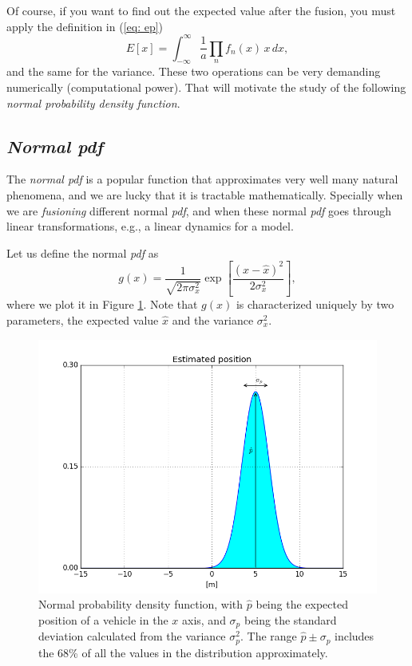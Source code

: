 \documentclass[11pt,a4paper]{article}
\begin{document}
Of course, if you want to find out the expected value after the fusion, you must apply the definition in (\ref{eq: ep})
\begin{equation}
	E[x] = \int_{-\infty}^{\infty} \frac{1}{a}\prod_n f_n(x)\, x \,dx,
\end{equation}
and the same for the variance. These two operations can be very demanding numerically (computational power). That will motivate the study of the following \emph{normal probability density function}.

\subsection{\emph{Normal pdf}}
The \emph{normal pdf} is a popular function that approximates very well many natural phenomena, and we are lucky that it is tractable mathematically. Specially when we are \emph{fusioning} different normal \emph{pdf}, and when these normal \emph{pdf} goes through linear transformations, e.g., a linear dynamics for a model.

Let us define the normal \emph{pdf} as
\begin{equation}
	g(x) = \frac{1}{\sqrt{2\pi\sigma_x^2}}\operatorname{exp}\left[\frac{(x-\hat x)^2}{2\sigma_x^2}\right],
\end{equation}
where we plot it in Figure \ref{fig: gauss}. Note that $g(x)$ is characterized uniquely by two parameters, the expected value $\hat x$ and the variance $\sigma^2_x$.

\begin{figure}
\centering
\includegraphics[scale=0.5]{./images/pdf_pos.png}
\caption{Normal probability density function, with $\hat p$ being the expected position of a vehicle in the $x$ axis, and $\sigma_p$ being the standard deviation calculated from the variance $\sigma_p^2$. The range $\hat p \pm \sigma_p$ includes the 68\% of all the values in the distribution approximately.}
\label{fig: gauss}
\end{figure}
\end{document}
